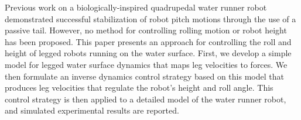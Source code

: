 Previous work on a biologically-inspired quadrupedal water runner robot demonstrated successful stabilization of robot pitch motions through the use of a passive tail. 
However, no method for controlling rolling motion or robot height has been proposed. 
This paper presents an approach for controlling the roll and height of legged robots running on the water surface. 
First, we develop a simple model for legged water surface dynamics that maps leg velocities to forces. 
We then formulate an inverse dynamics control strategy based on this model that produces leg velocities that regulate the robot's height and roll angle. 
This control strategy is then applied to a detailed model of the water runner robot, and simulated experimental results are reported.
